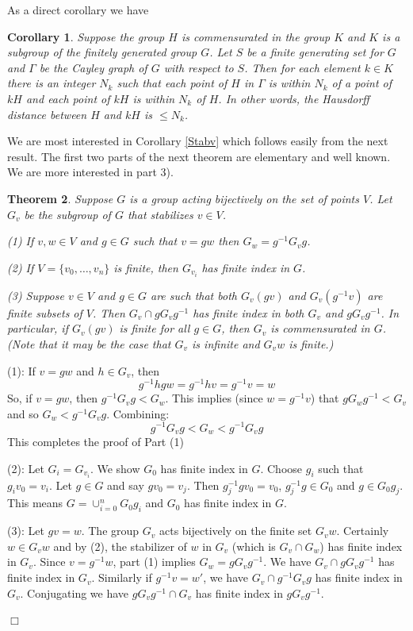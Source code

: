 \documentclass[12pt]{article}
\newtheorem{theorem}{Theorem}[subsection]
\newtheorem{corollary}[theorem]{Corollary}
\newenvironment{proof}{\addvspace{12pt}\noindent{\bf Proof:}}{
$\Box$\par\addvspace{12pt}}
\begin{document}
As a direct corollary we have
\begin{corollary} \label{C1}
Suppose the group $H$ is commensurated in the group $K$ and $K$ is a subgroup of the finitely generated group $G$. Let $S$ be a finite generating set for $G$ and $\Gamma$ be the Cayley graph of $G$ with respect to $S$. Then for each element $k\in K$ there is an integer $N_k$ such that each point of $H$ in $\Gamma$ is within $N_k$ of a point of $kH$ and each point of $kH$ is within $N_k$ of $H$. In other words, the Hausdorff distance between $H$  and $kH$ is $\leq N_k$. 
\end{corollary}

We are most interested in Corollary \ref{Stabv} which follows easily from the next result. 
The first two parts of the next theorem are elementary and well known. We are more interested in part 3).

\begin{theorem} \label{StabP} 
Suppose $G$ is a group acting bijectively on the set of points $V$.  Let $G_v$ be the subgroup of $G$ that stabilizes $v\in V$. 

(1) If  $v, w\in V$ and $g\in G$ such that $v=gw$ then $G_w= g^{-1} G_vg$. 

(2) If $V=\{v_0,\ldots, v_n\}$ is finite, then $G_{v_i}$ has finite index in $G$.

(3) Suppose $v\in V$ and $g\in G$ are such that both $G_v(gv)$ and $G_v(g^{-1}v)$ are finite subsets of $V$. Then $G_v\cap gG_vg^{-1}$ has finite index in both $G_v$ and $gG_vg^{-1}$. In particular, if $G_v(gv)$ is finite for all $g\in G$, then $G_v$ is commensurated in $G$. (Note that it may be the case that $G_v$ is infinite and $G_vw$ is finite.)

\end{theorem}
\begin{proof} (1):  If $v=gw$ and  $h\in G_v$, then 
$$g^{-1}hgw=g^{-1}hv=g^{-1}v=w$$
So, if $v=gw$, then $g^{-1}G_vg<G_w$. This implies (since $w=g^{-1}v$) that  $gG_wg^{-1}<G_v$ and so $G_w<g^{-1}G_vg$.
Combining:
$$g^{-1}G_vg<G_w<g^{-1}G_vg$$
This completes the proof of Part (1)

\medskip

(2): Let $G_i=G_{v_i}$. We show $G_0$ has finite index in $G$. Choose $g_i$ such that $g_iv_0=v_i$. Let $g\in G$ and say $gv_0=v_j$. Then $g_j^{-1}gv_0=v_0$,  $g_j^{-1}g\in G_0$ and $g\in G_0g_j$. This means $G=\cup_{i=0}^n G_0g_i$ and $G_0$ has finite index in $G$. 

\medskip

(3): Let $gv=w$. The group $G_v$ acts bijectively on the finite set $G_vw$. Certainly $w\in G_vw$ and by (2), the stabilizer of $w$ in $G_v$ (which is $G_v\cap G_w$) has finite index in $G_v$. Since $v=g^{-1}w$, part (1) implies $G_w=gG_vg^{-1}$. We have $G_v\cap gG_vg^{-1}$ has finite index in $G_v$. 
Similarly if $g^{-1}v=w'$, we have $G_v\cap g^{-1}G_vg$ has finite index in $G_v$. Conjugating we have $gG_vg^{-1}\cap G_v$ has finite index in $gG_vg^{-1}$. 
\end{proof}
\end{document}
